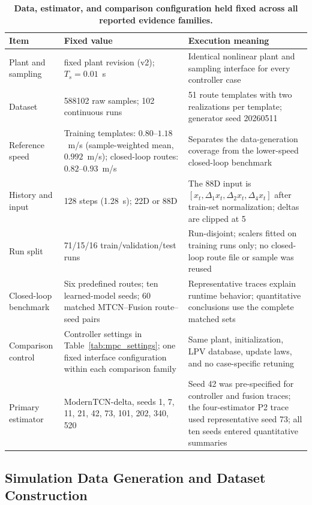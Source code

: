 \documentclass{ieeeaccess}
\begin{document}
\begin{table}[!tbp]
\centering
\caption{\textbf{Data, estimator, and comparison configuration held fixed across all reported evidence families.}}
\label{tab:frozen_experimental_configuration}
\scriptsize
\setlength{\tabcolsep}{3.4pt}
\setlength{\tabcolsep}{3pt}
\begin{tabular}{|p{}|p{}|p{}|}
\hline
Item & Fixed value & Execution meaning \\
\hline
Plant and sampling & fixed plant revision (v2); $T_s=0.01$~s & Identical nonlinear plant and sampling interface for every controller case \\
Dataset & 588102 raw samples; 102 continuous runs & 51 route templates with two realizations per template; generator seed 20260511 \\
Reference speed & Training templates: \mbox{$0.80$--$1.18$~m/s} (sample-weighted mean, $0.992$~m/s); closed-loop routes: \mbox{$0.82$--$0.93$~m/s} & Separates the data-generation coverage from the lower-speed closed-loop benchmark \\
History and input & 128 steps (1.28~s); 22D or 88D & The 88D input is $[x_t,\Delta_1x_t,\Delta_2x_t,\Delta_4x_t]$ after train-set normalization; deltas are clipped at 5 \\
Run split & 71/15/16 train/validation/test runs & Run-disjoint; scalers fitted on training runs only; no closed-loop route file or sample was reused \\
Closed-loop benchmark & Six predefined routes; ten learned-model seeds; 60 matched MTCN--Fusion route--seed pairs & Representative traces explain runtime behavior; quantitative conclusions use the complete matched sets \\
Comparison control & Controller settings in Table~\ref{tab:mpc_settings}; one fixed interface configuration within each comparison family & Same plant, initialization, LPV database, update laws, and no case-specific retuning \\
Primary estimator & ModernTCN-delta, seeds 1, 7, 11, 21, 42, 73, 101, 202, 340, 520 & Seed 42 was pre-specified for controller and fusion traces; the four-estimator P2 trace used representative seed 73; all ten seeds entered quantitative summaries \\
\hline
\end{tabular}
\end{table}

\subsection{Simulation Data Generation and Dataset Construction}
\end{document}
